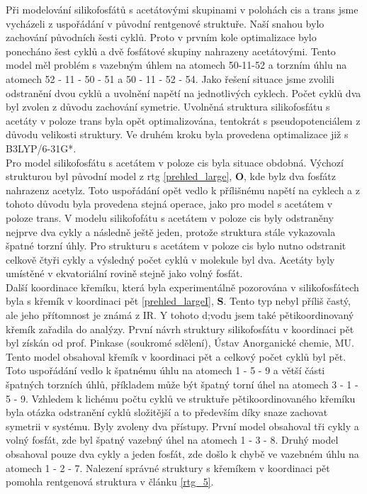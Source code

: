 \documentclass[
  digital, %
  table,   %
  lof,     %
  lot,     %
  oneside,
]{fithesis3}
\begin{document}
Při modelování silikofosfátů s acetátovými skupinami v polohách cis a trans jsme vycházeli z uspořádání v původní rentgenové struktuře. Naší snahou bylo zachování původních šesti cyklů. Proto v prvním kole optimalizace bylo ponecháno šest cyklů a dvě fosfátové skupiny nahrazeny acetátovými. Tento model měl problém s vazebným úhlem na atomech 50-11-52 a torzním úhlu na atomech 52 - 11 - 50 - 51 a 50 - 11 - 52 - 54. Jako řešení situace jsme zvolili odstranění dvou cyklů a uvolnění napětí na jednotlivých cyklech. Počet cyklů dva byl zvolen z důvodu zachování symetrie. Uvolněná struktura silikofosfátu s acetáty v poloze trans byla opět optimalizována, tentokrát s pseudopotenciálem z důvodu velikosti struktury. Ve druhém kroku byla provedena optimalizace již s B3LYP/6-31G*. \\
Pro model silikofosfátu s acetátem v poloze cis byla situace obdobná. Výchozí strukturou byl původní model z rtg \ref{prehled_large}, \textbf{O}, kde bylz dva fosfátz nahrazenz acetylz. Toto uspořádání opět vedlo k přílišnému napětí na cyklech a z tohoto důvodu byla provedena stejná operace, jako pro model s acetátem v poloze trans. V modelu silikofofátu s acetátem v poloze cis byly odstraněny nejprve dva cykly a následně ještě jeden, protože struktura stále vykazovala špatné torzní úhly.
Pro strukturu s acetátem v poloze cis bylo nutno odstranit celkově čtyři cykly a výsledný počet cyklů v molekule byl dva. Acetáty byly umístěné v ekvatoriální rovině stejně jako volný fosfát. \\
Další koordinace křemíku, která byla experimentálně pozorována v silikofosfátech byla s křemík v koordinaci pět \ref{prehled_largeI}, \textbf{S}. Tento typ nebyl příliš častý, ale jeho přítomnost je známá z IR. Y tohoto d;vodu jsem také pětikoordinovaný křemík zařadila do analýzy. První návrh struktury silikofosfátu v koordinaci pět byl získán od prof. Pinkase (soukromé sdělení), Ústav Anorganické chemie, MU. Tento model obsahoval křemík v koordinaci pět a celkový počet cyklů byl pět. Toto uspořádání vedlo k špatnému úhlu na atomech 1 - 5 - 9 a větší části špatných torzních úhlů, příkladem může být špatný torní úhel na atomech 3 - 1 - 5 - 9.  Vzhledem k lichému počtu cyklů ve struktuře pětikoordinovaného křemíku byla otázka odstranění cyklů složitější a to především díky snaze zachovat symetrii v systému. Byly zvoleny dva přístupy. První model obsahoval tři cykly a volný fosfát, zde byl špatný vazebný úhel na atomech 1 - 3 - 8. Druhý model obsahoval pouze dva cykly a jeden fosfát, zde došlo k chybě ve vazebném úhlu na atomech 1 - 2 - 7. Nalezení správné struktury s křemíkem v koordinaci pět pomohla rentgenová struktura v článku \cite{rtg_5} \ref{rtg_5}.
\end{document}
